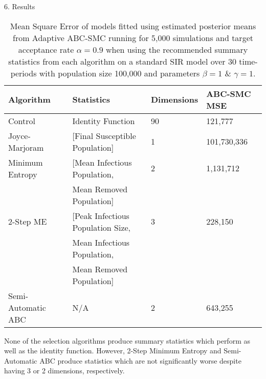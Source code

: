 \documentclass[ %
                  author={Dominic Hutchinson},
                supervisor={Dr. Daniel Lawson \& Dr. Sam Tickle},
                    degree={MEng Maths and Computer Science},
                     title={Bayesian Modelling of Epidemic Events},
                  subtitle={Summary Statistic Selection for Approximate Bayesian Computation Methods},
                      type={},
                      year={2021}
               ]{poster}
\begin{document}
\begin{frame}{}
\begin{columns}[t]
\begin{column}{0.475\linewidth}
      \begin{block}{\Large 6. Results}
        {\footnotesize
          \begin{table}
            \begin{tabular}{|l|l|l|l|}
              \hline
              \textbf{Algorithm}&\textbf{Statistics}&\textbf{Dimensions}&\textbf{ABC-SMC MSE}\\
              \hline \hline
              Control&Identity Function&90&121,777\\\hline
              Joyce-Marjoram&[Final Susceptible Population]&1&101,730,336\\\hline
              Minimum Entropy&[Mean Infectious Population,&2&1,131,712\\
              &Mean Removed Population]&&\\\hline
              2-Step ME&[Peak Infectious Population Size,&3&228,150\\
              &Mean Infectious Population,&&\\
              &Mean Removed Population]&&\\\hline
              Semi-Automatic ABC&N/A&2&643,255\\\hline
            \end{tabular}
            \caption{{\footnotesize Mean Square Error of models fitted using estimated posterior means from Adaptive ABC-SMC running for 5,000 simulations and target acceptance rate $\alpha=0.9$ when using the recommended summary statistics from each algorithm on a standard SIR model over 30 time-periods with population size 100,000 and parameters $\beta=1$ \& $\gamma=1$.}}
          \end{table}
        }
        None of the selection algorithms produce summary statistics which perform as well as the identity function. However, 2-Step Minimum Entropy and Semi-Automatic ABC produce statistics which are not significantly worse despite having 3 or 2 dimensions, respectively.
      \end{block}

    \end{column}

  \end{columns}

  \vfill

\end{frame}

\end{document}

